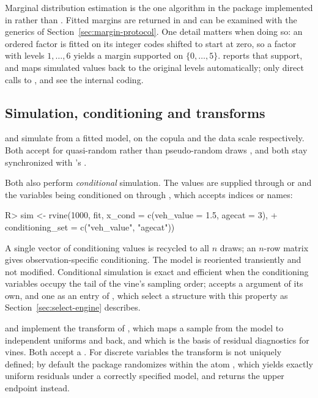 \documentclass[article]{jss}
\begin{document}
Marginal distribution estimation is the one algorithm in the package
implemented in  rather than .  Fitted margins are
returned in  and can be examined with the generics of
Section~\ref{sec:margin-protocol}.  One detail matters when doing so:
an ordered factor is fitted on its integer codes shifted to start at zero, so a
factor with levels $1, \dots, 6$ yields a margin supported on
$\{0, \dots, 5\}$.   reports that support, and
 maps simulated values back to the original levels
automatically; only direct calls to ,  and
 see the internal coding.

\subsection{Simulation, conditioning and transforms}\label{sec:sim-usage}

 and  simulate from a fitted model, on the
copula and the data scale respectively.  Both accept  for
quasi-random rather than pseudo-random draws \citep{cambou2017}, and both stay
synchronized with 's .

Both also perform \emph{conditional} simulation.  The values are supplied through  or  and the
variables being conditioned on through , which accepts
indices or names:

\begin{CodeChunk}
\begin{CodeInput}
R> sim <- rvine(1000, fit, x_cond = c(veh_value = 1.5, agecat = 3),
+    conditioning_set = c("veh_value", "agecat"))
\end{CodeInput}
\end{CodeChunk}

A single vector of conditioning values is recycled to all $n$ draws; an
$n$-row matrix gives observation-specific conditioning.  The model is
reoriented transiently and not modified.  Conditional simulation is exact and
efficient when the conditioning variables occupy the tail of the vine's
sampling order;  accepts a  argument
of its own, and  one as an entry of ,
which select a structure with this property as
Section~\ref{sec:select-engine} describes.

 and  implement the transform of
\citet{rosenblatt1952}, which maps a sample from the model to independent
uniforms and back, and which is the basis of residual diagnostics for vines.
Both accept a .  For discrete variables the transform
is not uniquely defined; by default the package randomizes within the atom
\citep{brockwell2007, czado2009}, which yields exactly uniform residuals under
a correctly specified model, and  returns the
upper endpoint instead.
\end{document}
